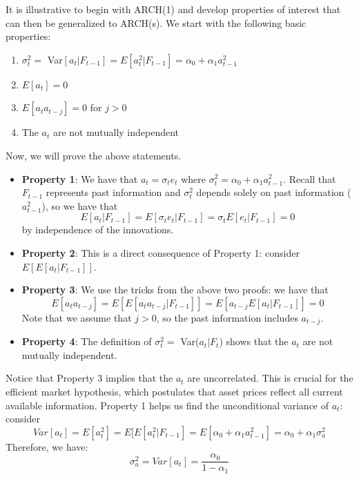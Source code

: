\documentclass[12pt]{article}
\begin{document}
It is illustrative to begin with ARCH(1) and develop properties of interest that can then be generalized to ARCH(s). We start with the following basic properties:

\begin{enumerate}
    \item $\sigma^2_t =$ Var$[a_t|F_{t-1}] = E[a^2_t|F_{t-1}] = \alpha_0 + \alpha_1a^2_{t-1}$
    
    \item $E[a_t] = 0$
    
    \item $E[a_ta_{t-j}] = 0$ for $j>0$
    
    \item The $a_t$ are not mutually independent
    
\end{enumerate}


Now, we will prove the above statements. 


\begin{itemize}

    \item \textbf{Property 1}: We have that $a_t = \sigma_t e_t$ where $\sigma^2_t = \alpha_0 + \alpha_1 a^2_{t-1}$. Recall that $F_{t-1}$ represents past information and $\sigma^2_t$ depends solely on past information ($a^2_{t-1}$), so we have that $$E[a_t|F_{t-1}] = E[\sigma_t e_t | F_{t-1}] = \sigma_t E[e_t|F_{t-1}] = 0$$ by independence of the innovations. 

    \item \textbf{Property 2}: This is a direct consequence of Property 1: consider $E[E[a_t|F_{t-1}]]$.

    \item \textbf{Property 3}: We use the tricks from the above two proofs: we have that $$E[a_ta_{t-j}] = E[E[a_ta_{t-j}|F_{t-1}]] = E[a_{t-j}E[a_t|F_{t-1}]] = 0$$  Note that we assume that $j>0$, so the past information includes $a_{t-j}$.
    
    \item \textbf{Property 4}: The definition of $\sigma^2_t =$ Var($a_t|F_t$) shows that the $a_t$ are not mutually independent.

\end{itemize}

\indent Notice that Property 3 implies that the $a_t$ are uncorrelated. This is crucial for the efficient market hypothesis, which postulates that asset prices reflect all current available information.  Property 1 helps us find the unconditional variance of $a_t$: consider $$Var[a_t] = E[a^2_t] = E[E[a^2_t|F_{t-1}] = E[\alpha_0 + \alpha_1a^2_{t-1}] = \alpha_0 + \alpha_1\sigma^2_a$$ Therefore, we have:  
    \begin{equation}
    \sigma^2_a = Var[a_t] = \frac{\alpha_0}{1-\alpha_1}
    \end{equation}
    
\end{document}
